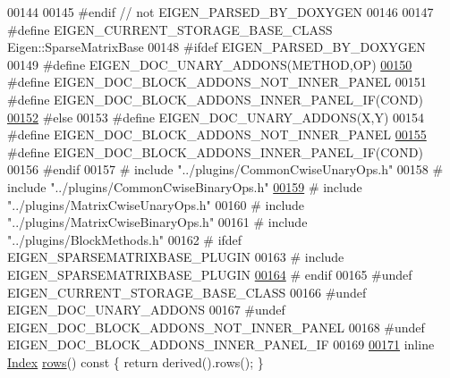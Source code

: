 \begin{DoxyCode}
00144 
00145 \textcolor{preprocessor}{#endif // not EIGEN\_PARSED\_BY\_DOXYGEN}
00146 
00147 \textcolor{preprocessor}{#define EIGEN\_CURRENT\_STORAGE\_BASE\_CLASS Eigen::SparseMatrixBase}
00148 \textcolor{preprocessor}{#ifdef EIGEN\_PARSED\_BY\_DOXYGEN}
00149 \textcolor{preprocessor}{#define EIGEN\_DOC\_UNARY\_ADDONS(METHOD,OP)           }
\hyperlink{group___sparse_core___module_af1dcaa7c8574dbc2205319a91d798417}{00150} \textcolor{preprocessor}{#define EIGEN\_DOC\_BLOCK\_ADDONS\_NOT\_INNER\_PANEL      }
00151 \textcolor{preprocessor}{#define EIGEN\_DOC\_BLOCK\_ADDONS\_INNER\_PANEL\_IF(COND) }
\hyperlink{group___sparse_core___module_a9db4c184e2222d0c9a945a191251d710}{00152} \textcolor{preprocessor}{#else}
00153 \textcolor{preprocessor}{#define EIGEN\_DOC\_UNARY\_ADDONS(X,Y)}
00154 \textcolor{preprocessor}{#define EIGEN\_DOC\_BLOCK\_ADDONS\_NOT\_INNER\_PANEL}
\hyperlink{group___sparse_core___module_a47a21ed23d5d10618ac0aca93903a32e}{00155} \textcolor{preprocessor}{#define EIGEN\_DOC\_BLOCK\_ADDONS\_INNER\_PANEL\_IF(COND)}
00156 \textcolor{preprocessor}{#endif}
00157 \textcolor{preprocessor}{#   include "../plugins/CommonCwiseUnaryOps.h"}
00158 \textcolor{preprocessor}{#   include "../plugins/CommonCwiseBinaryOps.h"}
\hyperlink{group___sparse_core___module_ad48496ebbfcd6cb685f893246de1d934}{00159} \textcolor{preprocessor}{#   include "../plugins/MatrixCwiseUnaryOps.h"}
00160 \textcolor{preprocessor}{#   include "../plugins/MatrixCwiseBinaryOps.h"}
00161 \textcolor{preprocessor}{#   include "../plugins/BlockMethods.h"}
00162 \textcolor{preprocessor}{#   ifdef EIGEN\_SPARSEMATRIXBASE\_PLUGIN}
00163 \textcolor{preprocessor}{#     include EIGEN\_SPARSEMATRIXBASE\_PLUGIN}
\hyperlink{group___sparse_core___module_aba4d0025dccf8a02d33b76c241e0625a}{00164} \textcolor{preprocessor}{#   endif}
00165 \textcolor{preprocessor}{#undef EIGEN\_CURRENT\_STORAGE\_BASE\_CLASS}
00166 \textcolor{preprocessor}{#undef EIGEN\_DOC\_UNARY\_ADDONS}
00167 \textcolor{preprocessor}{#undef EIGEN\_DOC\_BLOCK\_ADDONS\_NOT\_INNER\_PANEL}
00168 \textcolor{preprocessor}{#undef EIGEN\_DOC\_BLOCK\_ADDONS\_INNER\_PANEL\_IF}
00169 
\hyperlink{group___sparse_core___module_a1944e9fa9ce7937bfc3a87b2cb94371f}{00171}     \textcolor{keyword}{inline} \hyperlink{group___core___module_a554f30542cc2316add4b1ea0a492ff02}{Index} \hyperlink{group___sparse_core___module_a1944e9fa9ce7937bfc3a87b2cb94371f}{rows}()\textcolor{keyword}{ const }\{ \textcolor{keywordflow}{return} derived().rows(); \}

\end{DoxyCode}

